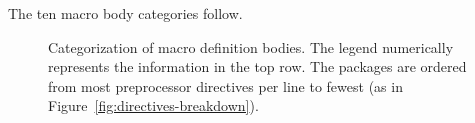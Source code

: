 \documentclass[10pt]{article}
\newcommand{\captionsmall}[1]{\caption[]{\small #1}}
\begin{document}
The ten macro body categories follow.  



\begin{figure}
\centerline{}
\captionsmall{Categorization of macro definition bodies.  The legend numerically
  represents the information in the top row.  The packages are ordered from
  most preprocessor directives per line to fewest (as in
  Figure~\ref{fig:directives-breakdown}).}
\label{fig:categorization}
\end{figure}



\label{sec:categorization-details}
\end{document}

